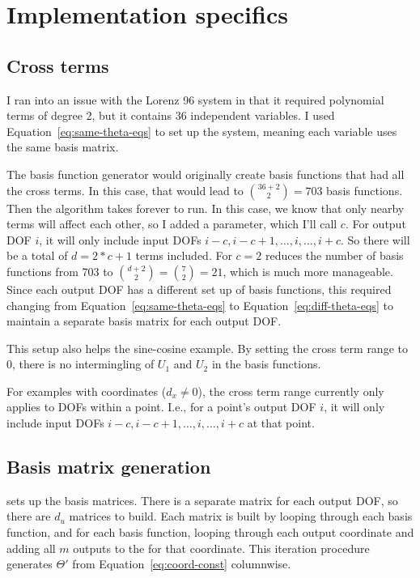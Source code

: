 \documentclass{article}
\def\lstinline#1{}%
\begin{document}
\section{Implementation specifics}

\subsection{Cross terms}
I ran into an issue with the Lorenz 96 system in that it required polynomial
terms of degree 2, but it contains 36 independent variables. I used
Equation~\ref{eq:same-theta-eqs} to set up the system, meaning each variable
uses the same basis matrix.

The basis function generator would originally create basis functions that had
all the cross terms. In this case, that would lead to $\binom{36 + 2}{2} = 703$
basis functions. Then the algorithm takes forever to run. In this case, we know
that only nearby terms will affect each other, so I added a
\lstinline{cross_term_range} parameter, which I'll call $c$. For output DOF $i$,
it will only include input DOFs $i-c,i-c+1,\hdots,i,\hdots,i+c$. So there will
be a total of $d = 2*c+1$ terms included. For $c=2$ reduces the number of basis
functions from 703 to $\binom{d+2}{2} = \binom{7}{2} = 21$, which is much more
manageable. Since each output DOF has a different set up of basis functions,
this required changing from Equation~\ref{eq:same-theta-eqs} to
Equation~\ref{eq:diff-theta-eqs} to maintain a separate basis matrix for each
output DOF.

This setup also helps the sine-cosine example. By setting the cross term range
to 0, there is no intermingling of $U_1$ and $U_2$ in the basis functions.

For examples with coordinates ($d_x \ne 0$), the cross term range currently only
applies to DOFs within a point. I.e., for a point's output DOF $i$, it will only
include input DOFs $i-c,i-c+1,\hdots,i,\hdots,i+c$ at that point.

\subsection{Basis matrix generation}

\lstinline{SINDyBasisAddVariables} sets up the basis matrices. There is a
separate matrix for each output DOF, so there are $d_u$ matrices to build.
Each matrix is built by looping through each basis function, and for each basis function,
looping through each output coordinate and adding all $m$ outputs to the for that coordinate.
This iteration procedure generates $\Theta'$ from Equation~\ref{eq:coord-const} columnwise.




\end{document}

